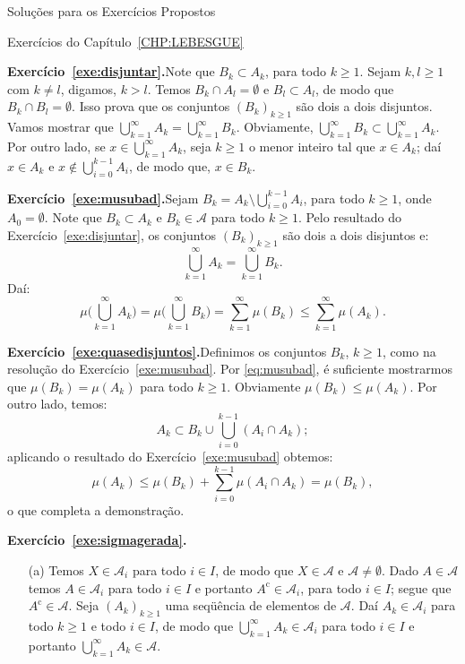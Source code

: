 \documentclass[oneside,final,11pt]{amsbook}
\newcommand{\compl}{\mathrm c}
\theoremstyle{remark}\newtheorem{exercise}{Exercício}[chapter]
\theoremstyle{remark}\newtheorem{*exercise}[exercise]{\hbox to 0pt{\hskip 0pt minus 1fil*}Exercício}
\theoremstyle{definition}\newtheorem{exdefin}{Definição}[chapter]
\theoremstyle{plain}\newtheorem{teo}{Teorema}[section]
\theoremstyle{plain}\newtheorem{lem}[teo]{Lema}
\theoremstyle{plain}\newtheorem{prop}[teo]{Proposição}
\theoremstyle{plain}\newtheorem{cor}[teo]{Corolário}
\theoremstyle{definition}\newtheorem{defin}[teo]{Definição}
\theoremstyle{remark}\newtheorem{rem}[teo]{Observação}
\theoremstyle{definition}\newtheorem{notation}[teo]{Notação}
\theoremstyle{definition}\newtheorem{convention}[teo]{Convenção}
\theoremstyle{definition}\newtheorem{example}[teo]{Exemplo}
\numberwithin{section}{chapter}
\numberwithin{equation}{section}
\begin{document}
\begin{chapter}{Soluções para os Exercícios Propostos}
\begin{section}{Exercícios do Capítulo~\ref{CHP:LEBESGUE}}
\medskip

\textbf{Exercício~\ref{exe:disjuntar}.}\enspace Note que $B_k\subset A_k$, para todo
$k\ge1$. Sejam $k,l\ge1$ com $k\ne l$, digamos, $k>l$.
Temos $B_k\cap A_l=\emptyset$ e $B_l\subset A_l$, de modo que $B_k\cap B_l=\emptyset$.
Isso prova que os conjuntos $(B_k)_{k\ge1}$ são dois a dois disjuntos.
Vamos mostrar que $\bigcup_{k=1}^\infty A_k=\bigcup_{k=1}^\infty B_k$. Obviamente,
$\bigcup_{k=1}^\infty B_k\subset\bigcup_{k=1}^\infty A_k$. Por outro lado, se $x\in\bigcup_{k=1}^\infty A_k$,
seja $k\ge1$ o menor inteiro tal que $x\in A_k$; daí $x\in A_k$ e $x\not\in\bigcup_{i=0}^{k-1}A_i$,
de modo que, $x\in B_k$.

\textbf{Exercício~\ref{exe:musubad}.}\enspace Sejam $B_k=A_k\setminus\bigcup_{i=0}^{k-1}A_i$,
para todo $k\ge1$, onde $A_0=\emptyset$. Note que $B_k\subset A_k$ e $B_k\in\mathcal A$ para todo $k\ge1$.
Pelo resultado do Exercício~\ref{exe:disjuntar}, os conjuntos $(B_k)_{k\ge1}$ são
dois a dois disjuntos e:
\[\bigcup_{k=1}^\infty A_k=\bigcup_{k=1}^\infty B_k.\]
Daí:
\begin{equation}\label{eq:musubad}
\mu\Big(\bigcup_{k=1}^\infty A_k\Big)=\mu\Big(\bigcup_{k=1}^\infty B_k\Big)
=\sum_{k=1}^\infty\mu(B_k)\le\sum_{k=1}^\infty\mu(A_k).
\end{equation}

\medskip

\textbf{Exercício~\ref{exe:quasedisjuntos}.}\enspace Definimos os conjuntos $B_k$, $k\ge1$, como na
resolução do Exercício~\ref{exe:musubad}. Por \eqref{eq:musubad}, é suficiente mostrarmos
que $\mu(B_k)=\mu(A_k)$ para todo $k\ge1$. Obviamente $\mu(B_k)\le\mu(A_k)$. Por outro lado, temos:
\[A_k\subset B_k\cup\bigcup_{i=0}^{k-1}(A_i\cap A_k);\]
aplicando o resultado do Exercício~\ref{exe:musubad} obtemos:
\[\mu(A_k)\le\mu(B_k)+\sum_{i=0}^{k-1}\mu(A_i\cap A_k)=\mu(B_k),\]
o que completa a demonstração.

\medskip

\textbf{Exercício~\ref{exe:sigmagerada}.}
\begin{itemize}
\item[(a)] Temos $X\in\mathcal A_i$ para todo $i\in I$, de modo que $X\in\mathcal A$ e $\mathcal A\ne\emptyset$.
Dado $A\in\mathcal A$ temos $A\in\mathcal A_i$ para todo $i\in I$ e portanto $A^\compl\in\mathcal A_i$,
para todo $i\in I$; segue que $A^\compl\in\mathcal A$. Seja $(A_k)_{k\ge1}$ uma seqüência de elementos
de $\mathcal A$. Daí $A_k\in\mathcal A_i$ para todo $k\ge1$ e todo $i\in I$, de modo que
$\bigcup_{k=1}^\infty A_k\in\mathcal A_i$ para todo $i\in I$ e portanto $\bigcup_{k=1}^\infty A_k\in\mathcal A$.


\end{itemize}
\end{section}
\end{chapter}
\end{document}
